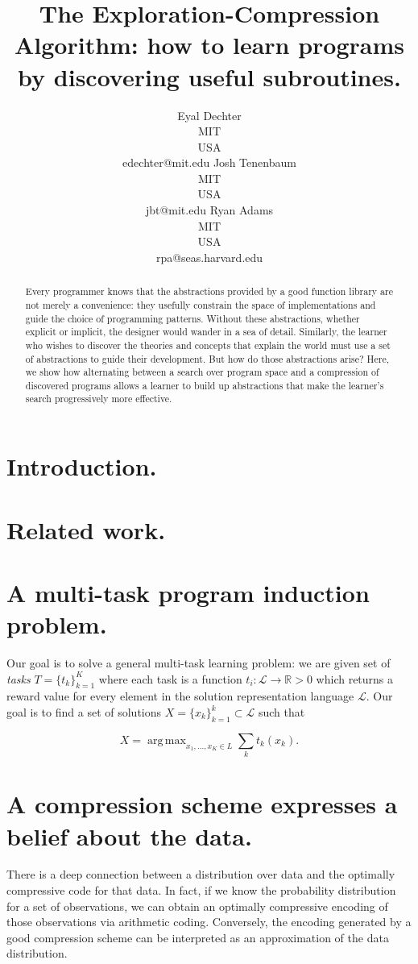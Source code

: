 \documentclass{article}
\title{The Exploration-Compression Algorithm: how to learn programs by discovering useful subroutines.}
\author{Eyal Dechter \\
MIT\\
USA \\
edechter@mit.edu
\And
Josh Tenenbaum \\
MIT\\
USA \\
jbt@mit.edu
\And 
Ryan Adams \\
MIT\\
USA \\
rpa@seas.harvard.edu}
\DeclareMathOperator*{\argmax}{arg\,max}
\begin{document}
\maketitle

\begin{abstract}
  Every programmer knows that the abstractions provided by a good
  function library are not merely a convenience: they usefully
  constrain the space of implementations and guide the choice of
  programming patterns. Without these abstractions, whether explicit
  or implicit, the designer would wander in a sea of
  detail. Similarly, the learner who wishes to discover the theories
  and concepts that explain the world must use a set of abstractions
  to guide their development. But how do those abstractions arise?
  Here, we show how alternating between a search over program space
  and a compression of discovered programs allows a learner to build
  up abstractions that make the learner's search progressively more
  effective.
\end{abstract}

\section{Introduction.}

\section{Related work.}

\section{A multi-task program induction problem.}
Our goal is to solve a general multi-task learning problem: we are
given set of \emph{tasks} $T=\{t_k\}_{k=1}^K$ where each task is a
function $t_i : \mathcal{L} \rightarrow \mathds{R} > 0$ which returns
a reward value for every element in the solution representation
language $\mathcal{L}$. Our goal is to find a set of solutions
$X = \{x_k\}_{k=1}^k \subset \mathcal{L}$ such that 

\[
X = \argmax_{x_1, \dots, x_K \in L} \sum_k t_k(x_k).
\]

\section{A compression scheme expresses a belief about the data.}
There is a deep connection between a distribution over data and the
optimally compressive code for that data. In fact, if we know the
probability distribution for a set of observations, we can obtain an
optimally compressive encoding of those observations via arithmetic
coding. Conversely, the encoding generated by a good compression
scheme can be interpreted as an approximation of the data
distribution. 
\end{document}
